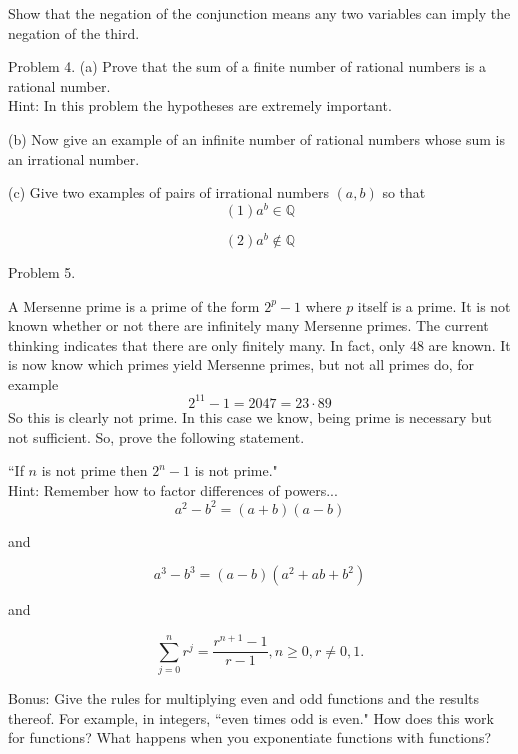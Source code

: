\documentclass[16 pt]{amsart}
\theoremstyle{definition}
\theoremstyle{remark}
\numberwithin{equation}{subsection}
\newcommand{\Q}{\mathbb{Q}}
\begin{document}
Show that the negation of the conjunction means any two  variables can imply the negation of the third.

\newpage

Problem 4. (a) Prove that the sum of a finite number of rational numbers is a rational number.  \\
Hint: In this problem the hypotheses are extremely important.
\vspace{.5in}

(b) Now give an example of an infinite number of rational numbers whose sum is an irrational number.\\

\vspace{.5in}

(c) Give two examples of pairs of irrational numbers $(a,b)$ so that 
\[
(1) a^b \in \Q
\]

\[
(2) a^b \notin \Q
\]

\newpage

Problem 5. 

A Mersenne prime is a prime of the form $2^p -1$ where $p$ itself is a prime.  It is not known whether or not there are infinitely many Mersenne primes.  The current thinking indicates that there are only finitely many.  In fact, only 48 are known.  It is now know which primes yield Mersenne primes, but not all primes do, for example
\[
2^{11}-1 = 2047 = 23 \cdot 89 
\]
So this is clearly not prime.  In this case we know, being prime is necessary but not sufficient.  So, prove the following statement.\\

\vspace{.5in}

``If $n$ is not prime then $2^n-1$ is not prime."\\

Hint: Remember how to factor differences of powers... 
\[
a^2-b^2 = (a+b)(a-b)
\]
\begin{center} and \end{center}
\[
a^3 - b^3 = (a-b)(a^2+ab+b^2)
\]
\begin{center} and \end{center}
\[
\sum_{j=0}^{n} r^j = \frac{r^{n+1}-1}{r-1}, n\ge 0, r\ne 0,1.
\]



\newpage

Bonus: Give the rules for multiplying even and odd functions and the results thereof.  For example, in integers, ``even times odd is even." How does this work for functions?  What happens when you exponentiate functions with functions?
\end{document}
